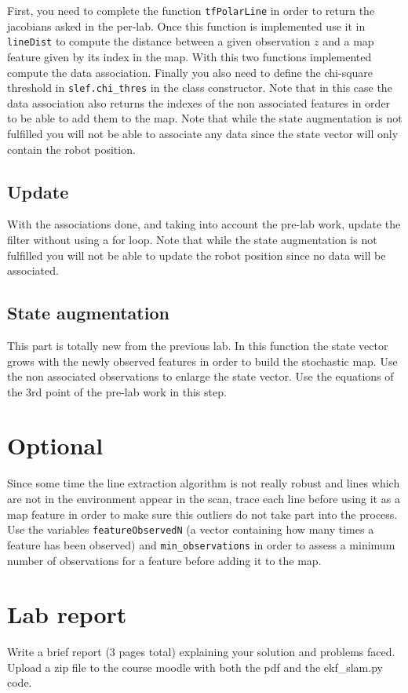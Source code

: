 \documentclass[a4paper,10pt]{article}
\begin{document}
First, you need to complete the function \texttt{tfPolarLine} in order to return the jacobians asked in the per-lab. Once this function is implemented use it in \texttt{lineDist} to compute the distance between a given observation $z$ and a map feature given by its index in the map. With this two functions implemented compute the data association. Finally you also need to define the chi-square threshold in \texttt{slef.chi\_thres} in the class constructor. Note that in this case the data association also returns the indexes of the non associated features in order to be able to add them to the map. Note that while the state augmentation is not fulfilled you will not be able to associate any data since the state vector will only contain the robot position.

\subsection{Update}
With the associations done, and taking into account the pre-lab work, update the filter without using a for loop. Note that while the state augmentation is not fulfilled you will not be able to update the robot position since no data will be associated.

\subsection{State augmentation}
This part is totally new from the previous lab. In this function the state vector grows with the newly observed features in order to build the stochastic map. Use the non associated observations to enlarge the state vector. Use the equations of the 3rd point of the pre-lab work in this step.

\section{Optional}
Since some time the line extraction algorithm is not really robust and lines which are not in the environment appear in the scan, trace each line before using it as a map feature in order to make sure this outliers do not take part into the process. Use the variables \texttt{featureObservedN} (a vector containing how many times a feature has been observed) and \texttt{min\_observations} in order to assess a minimum number of observations for a feature before adding it to the map.

\section{Lab report}
Write a brief report (3 pages total) explaining your solution and problems faced. Upload a zip file to the course moodle with both the pdf and the ekf\_slam.py code.
\end{document}
